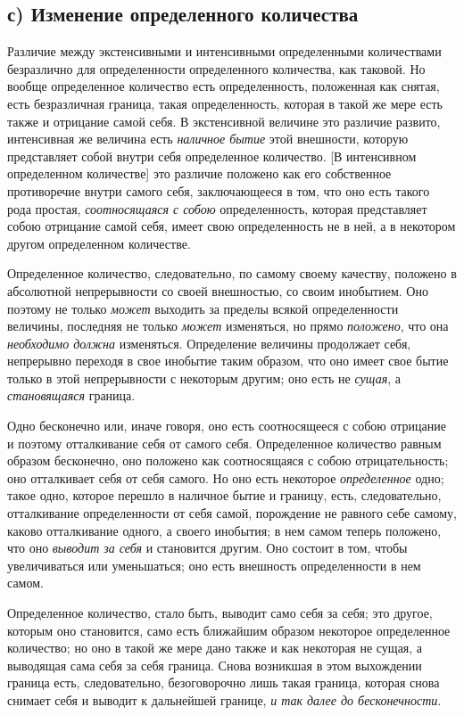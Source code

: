 \subsection[с) Изменение определенного количества]{с) Изменение
определенного количества}
Различие между экстенсивными и интенсивными определенными количествами
безразлично для определенности определенного количества, как таковой. Но
вообще определенное количество есть определенность, положенная как снятая,
есть безразличная граница, такая определенность, которая в такой же мере
есть также и отрицание самой себя. В экстенсивной величине это различие
развито, интенсивная же величина есть {\em наличное
бытие} этой внешности, которую представляет собой внутри себя определенное
количество. [В интенсивном определенном количестве] это различие положено
как его собственное противоречие внутри самого себя, заключающееся в том,
что оно есть такого рода простая, {\em соотносящаяся с
собою} определенность, которая представляет собою отрицание самой себя,
имеет свою определенность не в ней, а в некотором другом определенном
количестве.

Определенное количество, следовательно, по самому своему качеству, положено
в абсолютной непрерывности со своей внешностью, со своим инобытием. Оно
поэтому не только {\em может} выходить за пределы
всякой определенности величины, последняя не только
{\em может} изменяться, но прямо
{\em положено}, что она
{\em необходимо должна} изменяться. Определение
величины продолжает себя, непрерывно переходя в свое инобытие таким
образом, что оно имеет свое бытие только в этой непрерывности с некоторым
другим; оно есть не {\em сущая}, а
{\em становящаяся} граница.

Одно бесконечно или, иначе говоря, оно есть соотносящееся с собою отрицание
и поэтому отталкивание себя от самого себя. Определенное количество равным
образом бесконечно, оно положено как соотносящаяся с собою отрицательность;
оно отталкивает себя от себя самого. Но оно есть некоторое
{\em определенное} одно; такое одно, которое перешло в
наличное бытие и границу, есть, следовательно, отталкивание определенности
от себя самой, порождение не равного себе самому, каково отталкивание
одного, а своего инобытия; в нем самом теперь положено, что оно
{\em выводит за себя} и становится другим. Оно состоит
в том, чтобы увеличиваться или уменьшаться; оно есть внешность
определенности в нем самом.

Определенное количество, стало быть, выводит само себя за себя; это другое,
которым оно становится, само есть ближайшим образом некоторое определенное
количество; но оно в такой же мере дано также и как некоторая не сущая, а
выводящая сама себя за себя граница. Снова возникшая в этом выхождении
граница есть, следовательно, безоговорочно лишь такая граница, которая
снова снимает себя и выводит к дальнейшей границе,
{\em и так далее до бесконечности}.


